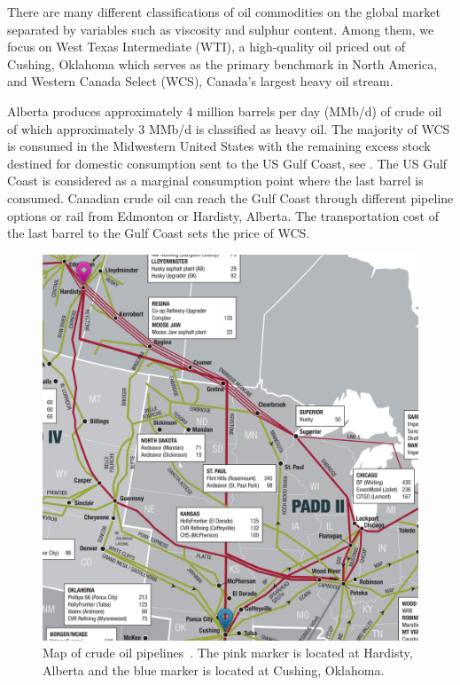 \documentclass[11pt]{m2pi}
\begin{document}
There are many different classifications of oil commodities on the global market separated by variables such as viscosity and sulphur content. Among them, we focus on West Texas Intermediate (WTI), a high-quality oil priced out of Cushing, Oklahoma which serves as the primary benchmark in North America, and Western Canada Select (WCS), Canada's largest heavy oil stream.

Alberta produces approximately 4 million barrels per day (MMb/d) of crude oil of which approximately 3 MMb/d is classified as heavy oil. The majority of WCS is consumed in the Midwestern United States with the remaining excess stock destined for domestic consumption sent to the US Gulf Coast, see \cite{Hackett}. The US Gulf Coast is considered as a marginal consumption point where the last barrel is consumed. Canadian crude oil can reach the Gulf Coast through different pipeline options or rail from Edmonton or Hardisty, Alberta. The transportation cost of the last barrel to the Gulf Coast sets the price of WCS.

\begin{figure}[h!]
    \centering
    \includegraphics[scale=0.40]{map5.jpg}
    \caption{Map of crude oil pipelines~\cite{pipelineMap}. The pink marker is located at Hardisty, Alberta and the blue marker is located at Cushing, Oklahoma.}
    \label{fig:PADD Map}
\end{figure}
\end{document}

